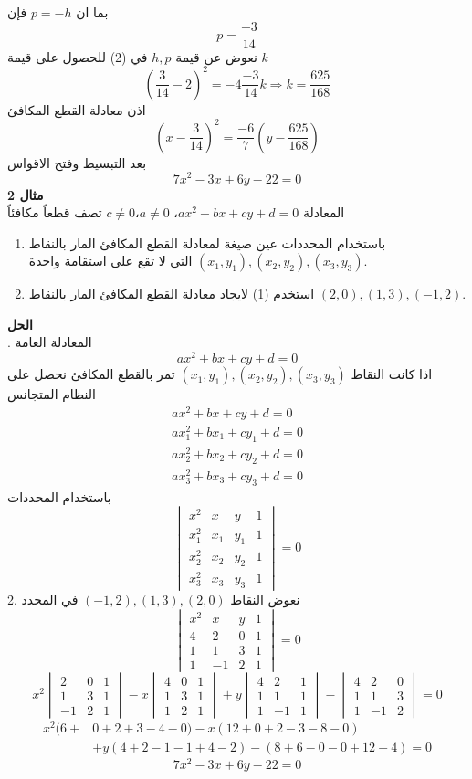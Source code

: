 بما ان $p = -h$ فإن 
\[
\boxed{p = \frac{-3}{14}}
\]
نعوض عن قيمة $h,p$ في (2) للحصول على قيمة $k$
\[
\left(\frac{3}{14} - 2\right)^2 = - 4 \frac{-3}{14} k \Rightarrow \boxed{k = \frac{625}{168}}
\]
اذن معادلة القطع المكافئ
\[
\left(x- \frac{3}{14}\right)^2 = \frac{-6}{7} \left(y - \frac{625}{168}\right)
\]
بعد التبسيط وفتح الاقواس
\[
7x^2 - 3x + 6y - 22=0
\]
\noindent
\textbf{مثال 2}\\
\noindent
المعادلة $ax^2+bx+cy+d=0$، $a\neq0$،$c\neq0$ تصف قطعاً مكافئاً
\begin{enumerate}
	\item باستخدام المحددات عين صيغة لمعادلة القطع المكافئ المار بالنقاط $(x_1, y_1) , (x_2, y_2) , (x_3, y_3)$ التي لا تقع على استقامة واحدة.
	\item استخدم (1) لايجاد معادلة القطع المكافئ المار بالنقاط 
	$(2, 0), (1, 3), (-1,2)$.
\end{enumerate} 

\noindent
\textbf{الحل}\\
. المعادلة العامة 
\[
ax^2+bx+cy+d=0
\]
اذا كانت النقاط $(x_1,y_1),(x_2,y_2),(x_3,y_3)$ تمر بالقطع المكافئ نحصل على النظام المتجانس
\begin{align*}
	ax^2+bx+cy+d=0\\
	ax_1^2+bx_1+cy_1+d=0\\
	ax_2^2+bx_2+cy_2+d=0\\
	ax_3^2+bx_3+cy_3+d=0
\end{align*}
باستخدام المحددات
\[
\begin{vmatrix}
	x^2  & x & y & 1\\
	x_1^2  & x_1 & y_1 & 1\\
	x_2^2  & x_2 & y_2 & 1\\
	x_3^2  & x_3 & y_3 & 1
\end{vmatrix} = 0
\]
2. نعوض النقاط 
$(-1,2), (1,3), (2,0)$
في المحدد
\[
\begin{vmatrix}
	x^2 & x& y& 1\\
	4 & 2 & 0 & 1\\
	1 & 1& 3 & 1\\
	1 & -1 & 2&1
\end{vmatrix} = 0
\]
\[
x^2\begin{vmatrix}
	2 & 0&1\\
	1&3&1\\
	-1&2&1
\end{vmatrix}
-x \begin{vmatrix}
	4&0&1\\
	1&3&1\\
	1&2&1
\end{vmatrix}
+ y\begin{vmatrix}
	4&2&1\\
	1&1&1\\
	1&-1&1
\end{vmatrix}
-\begin{vmatrix}
	4&2&0\\
	1&1&3\\
	1&-1&2
\end{vmatrix} = 0
\]
\begin{align*}
	x^2(6+&0+2+3-4-0) - x(12+0+2-3-8-0)\\
	&+ y (4+2-1-1+4-2) - (8+6-0-0+12-4) = 0
\end{align*}
\[
7x^2 - 3x + 6y - 22=0
\]